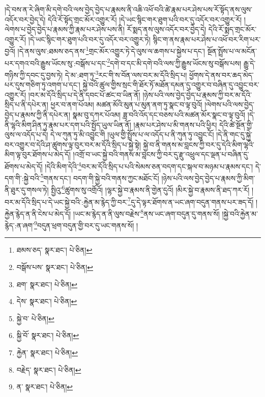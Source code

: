 །དེ་བས་ན་རེ་ཞིག་མི་དགེ་བའི་ལས་བྱེད་བྱེད་པ་རྣམས་ནི་འཆི་འཕོ་བའི་ཚེ་རྣམ་པར་ཤེས་པས་རོ་སྟོད་ནས་ལུས་འདོར་བར་བྱེད་དེ། དེའི་རོ་སྟོད་གྲང་མོར་འགྱུར་རོ། །དེ་ཡང་སྙིང་གར་ཐུག་པའི་བར་དུ་འདོར་བར་འགྱུར་རོ། །ལེགས་པ་བྱེད་བྱེད་པ་རྣམས་ཀྱི་རྣམ་པར་ཤེས་པས་ནི། རོ་སྨད་ནས་ལུས་འདོར་བར་བྱེད་དེ། དེའི་རོ་སྨད་གྲང་མོར་འགྱུར་རོ། །དེ་ཡང་སྙིང་གར་ཐུག་པའི་བར་དུ་འདོར་བར་འགྱུར་ཏེ། སྙིང་ག་ནས་རྣམ་པར་ཤེས་པ་འཕོ་བར་རིག་པར་བྱའོ། །དེ་ནས་ལུས་:ཐམས་ཅད་ནས་\footnote{ཐམས་ཅད་  སྣར་ཐང་།  པེ་ཅིན། }གྲང་མོར་འགྱུར་ཏེ་དེ་ལུས་ལ་ཆགས་པ་སྐྱེས་པ་དང་། སྔོན་སྤྲོས་པ་ལ་མངོན་པར་དགའ་བའི་རྒྱུས་ཡོངས་སུ་:བསྒོས་པ་དང་\footnote{བསྒོས་པས་  སྣར་ཐང་།  པེ་ཅིན། }དགེ་བ་དང་མི་དགེ་བའི་ལས་ཀྱི་རྒྱུས་ཡོངས་སུ་བསྒོས་པས། རྒྱུ་དེ་གཉིས་ཀྱི་དབང་དུ་བྱས་ཏེ། དེ་མ་:ཐག་ཏུ་\footnote{ཐག་  སྣར་ཐང་།  པེ་ཅིན། }རང་གི་ས་བོན་ལས་བར་མ་དོའི་སྲིད་པ། ཕྱོགས་དེ་ནས་བར་ཆད་མེད་པར་དུས་གཅིག་ཏུ་འགག་པ་དང་། སྐྱེ་བའི་ཚུལ་གྱིས་སྲང་གི་ཐོར་ཏོ་མཐོན་དམན་དུ་འགྱུར་བ་བཞིན་དུ་འབྱུང་བར་འགྱུར་རོ། །བར་མ་དོའི་སྲིད་པ་དེ་ནི་དབང་པོ་ཚང་བ་ཡིན་ནོ། །ཉེས་པའི་ལས་བྱེད་བྱེད་པ་རྣམས་ཀྱི་བར་མ་དོའི་སྲིད་པ་ནི་དཔེར་ན། ཕྱར་བ་ནག་པོའམ། མཚན་མོའི་མུན་པ་མུན་ནག་ཏུ་སྣང་བ་ལྟ་བུའོ། །ལེགས་པའི་ལས་བྱེད་བྱེད་པ་རྣམས་ཀྱི་ནི་དཔེར་ན། སྣམ་བུ་དཀར་པོའམ། ཟླ་བའི་འོད་དང་བཅས་པའི་མཚན་མོར་སྣང་བ་ལྟ་བུའོ། །དེ་ནི་ལྷའི་མིག་ཤིན་ཏུ་རྣམ་པར་དག་པའི་སྤྱོད་ཡུལ་ཡིན་ནོ། །རྣམ་པར་ཤེས་པ་མི་གནས་པའི་ཕྱིར། དེའི་ཚེ་སྔོན་གྱི་ལུས་ལ་འདོད་པ་དེ། དེ་ལ་ཀུན་ཏུ་མི་འབྱུང་གི །ཡུལ་གྱི་སྤྲོས་པ་ལ་འདོད་པ་ནི་ཀུན་ཏུ་འབྱུང་ངོ། །དེ་ནི་གང་དུ་སྐྱེ་བར་འགྱུར་བ་དེའི་ཤ་ཚུགས་ལྟ་བུར་བར་མ་དོའི་སྲིད་པ་སྐྱེ་སྟེ། སྐྱེ་བ་ནི་གནས་མ་བླངས་ཀྱི་བར་དུ་དེའི་མིག་ལྷའི་མིག་ལྟ་བུར་ཐོགས་པ་མེད་དོ། །འགྲོ་བ་ཡང་སྐྱེ་བའི་གནས་མ་བླངས་ཀྱི་བར་དུ་རྫུ་འཕྲུལ་དང་ལྡན་པ་བཞིན་དུ་ཐོགས་པ་མེད་དོ། །དེའི་མིག་དེའི་\footnote{དེས་  སྣར་ཐང་།  པེ་ཅིན། }བར་མ་དོའི་སྲིད་པ་པའི་སེམས་ཅན་བདག་དང་སྐལ་བ་མཉམ་པ་རྣམས་དང་། དེ་དག་གི་:སྐྱེ་བའི་\footnote{སྐྱེ་བ་  པེ་ཅིན། }གནས་དང་། བདག་གི་སྐྱེ་བའི་གནས་ཀྱང་མཐོང་ངོ། །ཉེས་པའི་ལས་བྱེད་བྱེད་པ་རྣམས་ཀྱི་མིག་ནི་ཐུར་དུ་གསལ་ཏེ། སྤྱིའུ་\footnote{སྐྱི་བོ་  སྣར་ཐང་།  པེ་ཅིན། }ཚུགས་སུ་འགྲོའོ། །ལྷར་སྐྱེ་བ་རྣམས་ནི་གྱེན་དུའོ། །མིར་སྐྱེ་བ་རྣམས་ནི་ཐད་ཀར་རོ། །བར་མ་དོའི་སྲིད་པ་དེ་ཡང་སྐྱེ་བའི་:རྐྱེན་མ་རྙེད་ཀྱི་བར་\footnote{རྐྱེན་  སྣར་ཐང་།  པེ་ཅིན། }དུ་དེ་ལྟར་ཐོགས་ན་ཡང་ཞག་བདུན་གནས་པར་ཟད་དོ། །རྐྱེན་རྙེད་ན་ནི་ངེས་པ་མེད་དོ། །ཡང་མ་རྙེད་ན་ནི་ལུས་བརྗེས་\footnote{བརྗེད་  སྣར་ཐང་།  པེ་ཅིན། }ནས་ཡང་ཞག་བདུན་དུ་གནས་སོ། །སྐྱེ་བའི་རྐྱེན་མ་རྙེད་:ན་ཞག་\footnote{ན་  སྣར་ཐང་།  པེ་ཅིན། }བདུན་ཕྲག་བདུན་གྱི་བར་དུ་ཡང་གནས་སོ། །
